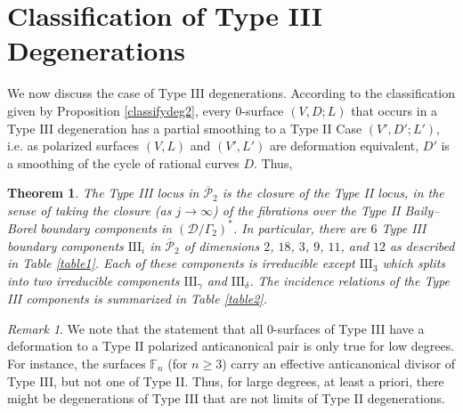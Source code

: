 \documentclass{amsart}
\numberwithin{equation}{section}
\theoremstyle{plain}
\newtheorem{theorem}[equation]{Theorem}
\theoremstyle{remark}
\newtheorem{remark}[equation]{Remark}
\theoremstyle{definition}
\newcommand{\bF}{\mathbb{F}}
\newcommand{\calP}{\mathcal{P}}
\newcommand{\calD}{\mathcal{D}}
\newcommand{\III}{\textrm{III}}
\begin{document}

\section{Classification of Type III Degenerations}\label{secttype3}
 We now discuss the case of Type III degenerations. According to the classification given by Proposition \ref{classifydeg2}, every $0$-surface $(V,D;L)$ that occurs in a Type III degeneration has a partial smoothing to a Type II Case $(V',D';L')$, i.e. as polarized surfaces $(V,L)$ and $(V',L')$ are deformation equivalent, $D'$ is a smoothing of the cycle of rational curves $D$. Thus,  
 
 
 
\begin{theorem}\label{thmtype3}
The Type III locus in $\overline{\calP}_2$ is the closure of the Type II locus, in the sense of taking the closure (as $j\to \infty$) of the fibrations  over the Type II  Baily--Borel boundary components in $(\calD/\Gamma_2)^*$. In particular, there are $6$  Type III boundary components $\III_i$ in  $\overline{\calP}_2$ of dimensions $2$, $18$, $3$, $9$, $11$, and $12$ as described in Table \ref{table1}. Each of these components is irreducible except $\III_3$ which splits into two irreducible components $\III_\gamma$ and $\III_\delta$.  The incidence relations of the Type III components is summarized in Table \ref{table2}.
\end{theorem}

\begin{remark}
We note that the statement that all $0$-surfaces of Type III have a deformation to a Type II polarized anticanonical pair is only true for low degrees. For instance, the surfaces $\bF_n$ (for $n\ge 3$) carry an effective anticanonical divisor of Type III, but not one of Type II. Thus, for large degrees, at least a priori, there might be degenerations of Type III that are not limits of Type II degenerations.
\end{remark}
\end{document}
